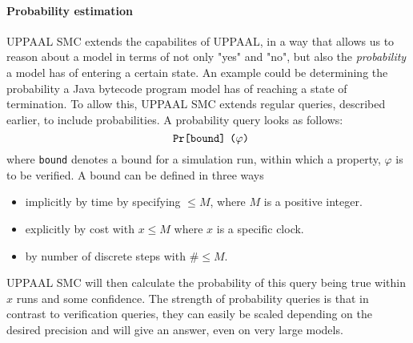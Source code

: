 \paragraph{Probability estimation}
UPPAAL SMC extends the capabilites of UPPAAL, in a way that allows us to reason about a model in terms of not only "yes" and "no", but also the \textit{probability} a model has of entering a certain state. An example could be determining the probability a Java bytecode program model has of reaching a state of termination. To allow this, UPPAAL SMC extends regular queries, described earlier, to include probabilities. A probability query looks as follows:
$$\texttt{Pr\relax[bound\relax] ($\varphi$)}$$
where \texttt{bound} denotes a bound for a simulation run, within which a property, $\varphi$ is to be verified. A bound can be defined in three ways~\cite[p. 402]{smc}

\begin{itemize}
\item implicitly by time by specifying $\leq M$, where $M$ is a positive integer.
\item explicitly by cost with $x \leq M$ where $x$ is a specific clock.
\item by number of discrete steps with $\# \leq M$.\\
\end{itemize}
\noindent UPPAAL SMC will then calculate the probability of this query being true within $x$ runs and some confidence. The strength of probability queries is that in contrast to verification queries, they can easily be scaled depending on the desired precision and will give an answer, even on very large models.
